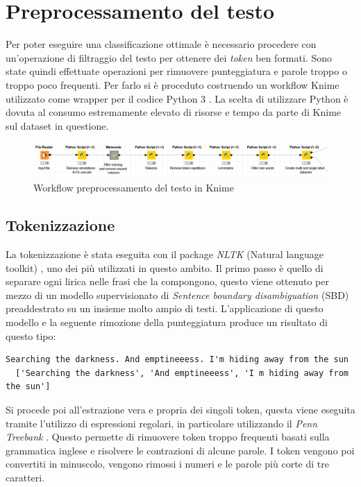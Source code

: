 \documentclass[technote]{IEEEtran}
\begin{document}
\section{Preprocessamento del testo}
Per poter eseguire una classificazione
ottimale è necessario procedere con un'operazione di filtraggio
del testo per ottenere dei \textit{token} ben formati.
Sono state quindi effettuate operazioni per rimuovere punteggiatura e
parole troppo o troppo poco frequenti.
Per farlo si è proceduto costruendo un workflow Knime
\cite{10.1007/978-3-540-78246-9_38}
utilizzato come wrapper per il codice Python 3 \cite{10.5555/1593511}.
La scelta di utilizzare Python è dovuta al consumo estremamente elevato
di risorse e tempo da parte di Knime sul dataset in questione.
\begin{figure}[H]
\centerline{\includegraphics[width=1\columnwidth]{images/knime-text-prep}}
\caption{Workflow preprocessamento del testo in Knime}
\label{fig_knime_prep}
\end{figure}
\subsection{Tokenizzazione}
La tokenizzazione è stata eseguita con il package \textit{NLTK}
(Natural language toolkit) \cite{Loper02nltk:the}, uno dei più utilizzati
in questo ambito. Il primo passo è quello di separare ogni lirica nelle
frasi che la compongono, questo viene ottenuto per mezzo di
un modello supervisionato di \textit{Sentence boundary disambiguation} (SBD) preaddestrato su un insieme molto ampio di testi.
L'applicazione di questo modello e la seguente rimozione della punteggiatura
produce un risultato di questo tipo:

\begin{lstlisting}[basicstyle=\tiny]
  Searching the darkness. And emptineeess. I'm hiding away from the sun  
  ['Searching the darkness', 'And emptineeess', 'I m hiding away from the sun']  
\end{lstlisting}
Si procede poi all'estrazione vera e propria dei singoli token,
questa viene eseguita tramite l'utilizzo di espressioni regolari,
in particolare utilizzando il \textit{Penn Treebank}
\cite{marcus-etal-1993-building}. Questo permette di rimuovere
token troppo frequenti basati sulla grammatica inglese e risolvere
le contrazioni di alcune parole. I token vengono poi convertiti
in minuscolo, vengono rimossi i numeri e le parole più corte di tre caratteri.
\end{document}
